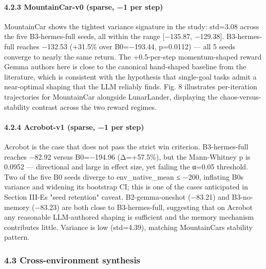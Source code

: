 \paragraph{4.2.3 MountainCar-v0 (sparse, −1 per step)}\label{423-mountaincar-v0-sparse-1-per-step}

MountainCar shows the tightest variance signature in the study: std=3.08 across the five B3-hermes-full seeds, all within the range {[}−135.87, −129.38{]}. B3-hermes-full reaches −132.53 (+31.5\% over B0=−193.44, p=0.0112) --- all 5 seeds converge to nearly the same return. The +0.5-per-step momentum-shaped reward Gemma authors here is close to the canonical hand-shaped baseline from the literature, which is consistent with the hypothesis that single-goal tasks admit a near-optimal shaping that the LLM reliably finds. Fig. 8 illustrates per-iteration trajectories for MountainCar alongside LunarLander, displaying the chaos-versus-stability contrast across the two reward regimes.

\paragraph{4.2.4 Acrobot-v1 (sparse, −1 per step)}\label{424-acrobot-v1-sparse-1-per-step}

Acrobot is the case that does not pass the strict win criterion. B3-hermes-full reaches −82.92 versus B0=−194.96 (Δ=+57.5\%), but the Mann-Whitney p is 0.0952 --- directional and large in effect size, yet failing the α=0.05 threshold. Two of the five B0 seeds diverge to env\_native\_mean ≤ −200, inflating B0\textquotesingle s variance and widening its bootstrap CI; this is one of the cases anticipated in Section III-E\textquotesingle s "seed retention" caveat. B2-gemma-oneshot (−83.21) and B3-no-memory (−83.23) are both close to B3-hermes-full, suggesting that on Acrobot any reasonable LLM-authored shaping is sufficient and the memory mechanism contributes little. Variance is low (std=4.39), matching MountainCar\textquotesingle s stability pattern.

\subsubsection{4.3 Cross-environment synthesis}\label{43-cross-environment-synthesis}

